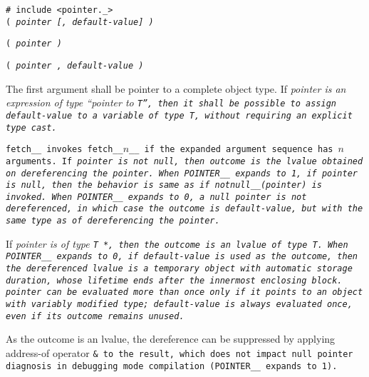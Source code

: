 
\tt{# include <pointer._>}\\

\s\s\s\s\tt{(} \it{pointer} [\tt{,} \it{default-value}] \tt{)}

\s\tt{(} \it{pointer} \tt{)}

\s\tt{(} \it{pointer} \phantom{[}\tt{,} \it{default-value}\phantom{]} \tt{)}


The first argument shall be pointer to a complete object type.
If \it{pointer} is an expression of type ``pointer to \tt{T}'',
then it shall be possible to assign \it{default-value} to a
variable of type \tt{T}, without requiring an explicit type cast.


\tt{fetch__} invokes \tt{fetch__}$n$\_\_ if the
expanded argument sequence has $n$ arguments.
If \it{pointer} is not null,
then outcome is the lvalue obtained on dereferencing the pointer.
When \tt{POINTER__} expands to \tt{1}, if \it{pointer} is null,
then the behavior is same as if \tt{notnull__(}\it{pointer}\tt{)} is invoked.
When \tt{POINTER__} expands to \tt{0}, a null pointer is not dereferenced,
in which case the outcome is \it{default-value},
but with the same type as of dereferencing the pointer.

If \it{pointer} is of type \tt{T *},
then the outcome is an lvalue of type \tt{T}.
When \tt{POINTER__} expands to \tt{0}, if \it{default-value} is used as the
outcome, then the dereferenced lvalue is a temporary object with automatic
storage duration, whose lifetime ends after the innermost enclosing block.
\it{pointer} can be evaluated more than once only if
 it points to an object with variably modified type;
\it{default-value} is always evaluated once, even if its outcome remains unused.

\note As the outcome is an lvalue, the dereference can be
suppressed by applying address-of operator \tt{&} to the result,
which does not impact null pointer diagnosis in debugging mode compilation
(\tt{POINTER__} expands to \tt{1}).
